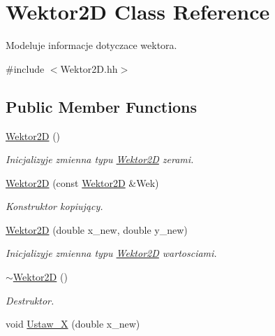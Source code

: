 \hypertarget{class_wektor2_d}{\section{Wektor2\+D Class Reference}
\label{class_wektor2_d}
}


Modeluje informacje dotyczace wektora.  




{\ttfamily \#include $<$Wektor2\+D.\+hh$>$}

\subsection*{Public Member Functions}
\begin{DoxyCompactItemize}
\item 
\hypertarget{class_wektor2_d_a0033c26592fddb39e1ae856f1356934c}{\hyperlink{class_wektor2_d_a0033c26592fddb39e1ae856f1356934c}{Wektor2\+D} ()}\label{class_wektor2_d_a0033c26592fddb39e1ae856f1356934c}

\begin{DoxyCompactList}\small\item\em Inicjalizyje zmienna typu \hyperlink{class_wektor2_d}{Wektor2\+D} zerami. \end{DoxyCompactList}\item 
\hypertarget{class_wektor2_d_a63ea2751b363ee28a8cc52489bd8e314}{\hyperlink{class_wektor2_d_a63ea2751b363ee28a8cc52489bd8e314}{Wektor2\+D} (const \hyperlink{class_wektor2_d}{Wektor2\+D} \&Wek)}\label{class_wektor2_d_a63ea2751b363ee28a8cc52489bd8e314}

\begin{DoxyCompactList}\small\item\em Konstruktor kopiujący. \end{DoxyCompactList}\item 
\hyperlink{class_wektor2_d_a731c3a68d9c7d209cc4d130e7d26b488}{Wektor2\+D} (double x\+\_\+new, double y\+\_\+new)
\begin{DoxyCompactList}\small\item\em Inicjalizyje zmienna typu \hyperlink{class_wektor2_d}{Wektor2\+D} wartosciami. \end{DoxyCompactList}\item 
\hyperlink{class_wektor2_d_a7f1dbc81d52c6ecb8788d3b55234aa94}{$\sim$\+Wektor2\+D} ()
\begin{DoxyCompactList}\small\item\em Destruktor. \end{DoxyCompactList}\item 
\hypertarget{class_wektor2_d_a1335fe5aa19f0d521a0c87857ba42f65}{void \hyperlink{class_wektor2_d_a1335fe5aa19f0d521a0c87857ba42f65}{Ustaw\+\_\+\+X} (double x\+\_\+new)}\label{class_wektor2_d_a1335fe5aa19f0d521a0c87857ba42f65}


\end{DoxyCompactItemize}
